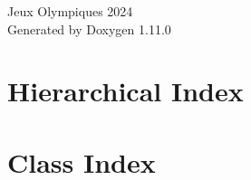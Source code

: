 \documentclass[twoside]{book}
\newcommand{\+}{\discretionary{\mbox{\scriptsize$\hookleftarrow$}}{}{}}
\newcommand{\clearemptydoublepage}{%
    \newpage{\pagestyle{empty}\cleardoublepage}%
  }
\begin{document}
  \raggedbottom
    \hypersetup{pageanchor=false,
                bookmarksnumbered=true,
                pdfencoding=unicode
               }
  \begin{titlepage}
  \vspace*{7cm}
  \begin{center}%
  {\Large Jeux Olympiques 2024}\\
  \vspace*{1cm}
  {\large Generated by Doxygen 1.11.0}\\
  \end{center}
  \end{titlepage}
  \clearemptydoublepage
  \tableofcontents
  \clearemptydoublepage
  \hypersetup{pageanchor=true}
\chapter{Hierarchical Index}

\chapter{Class Index}

\end{document}
